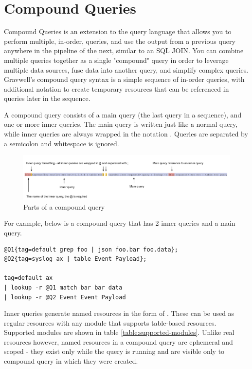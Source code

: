 \clearpage

\section{Compound Queries}
\label{sec:compoundqueries}
Compound Queries is an extension to the query language that allows you to
perform multiple, in-order, queries, and use the output from a previous query
anywhere in the pipeline of the next, similar to an SQL JOIN. You can combine
multiple queries together as a single "compound" query in order to leverage
multiple data sources, fuse data into another query, and simplify complex
queries. Gravwell's compound query syntax is a simple sequence of in-order
queries, with additional notation to create temporary resources that can be
referenced in queries later in the sequence.

A compound query consists of a main query (the last query in a sequence), and
one or more inner queries. The main query is written just like a normal query,
while inner queries are always wrapped in the notation
.  Queries are separated by a semicolon and
whitespace is ignored.

\begin{figure}
	\includegraphics[width=0.9\linewidth]{images/compound-breakdown.png}
	\caption{Parts of a compound query}
	\label{fig:compound-breakdown}
\end{figure}

For example, below is a compound query that has 2 inner queries and a main
query. 

\begin{verbatim}
@Q1{tag=default grep foo | json foo.bar foo.data};
@Q2{tag=syslog ax | table Event Payload};

tag=default ax 
| lookup -r @Q1 match bar bar data 
| lookup -r @Q2 Event Event Payload
\end{verbatim}

Inner queries generate named resources in the form of .
These can be used as regular resources with any module that supports
table-based resources. Supported modules are shown in table
\ref{table:supported-modules}. Unlike real resources however, named resources
in a compound query are ephemeral and scoped - they exist only while the query
is running and are visible only to compound query in which they were created.

